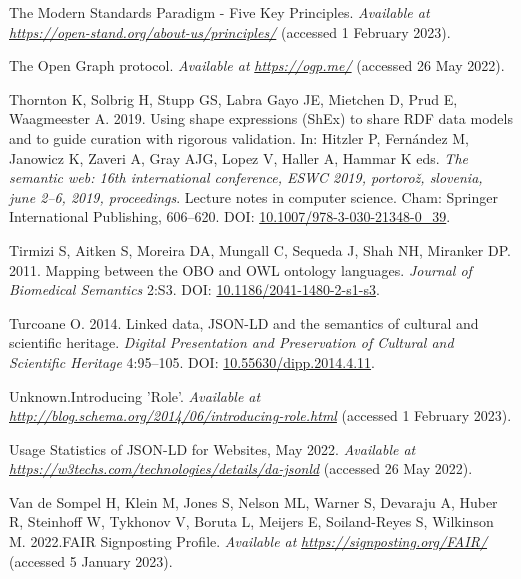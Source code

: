 \begin{CSLReferences}{1}{0}
\leavevmode{}%
The Modern Standards Paradigm - Five Key Principles. \emph{Available at} \href{https://open-stand.org/about-us/principles/}{\emph{https://open-stand.org/about-us/principles/}} (accessed 1 February 2023).

\leavevmode{}%
The Open Graph protocol. \emph{Available at} \href{https://ogp.me/}{\emph{https://ogp.me/}} (accessed 26 May 2022).

\leavevmode{}%
Thornton K, Solbrig H, Stupp GS, Labra Gayo JE, Mietchen D, Prud E, Waagmeester A. 2019. Using shape expressions (ShEx) to share RDF data models and to guide curation with rigorous validation. In: Hitzler P, Fernández M, Janowicz K, Zaveri A, Gray AJG, Lopez V, Haller A, Hammar K eds. \emph{The semantic web: 16th international conference, ESWC 2019, portorož, slovenia, june 2--6, 2019, proceedings}. Lecture notes in computer science. Cham: Springer International Publishing, 606--620. DOI: \href{https://doi.org/10.1007/978-3-030-21348-0_39}{10.1007/978-3-030-21348-0\_39}.

\leavevmode{}%
Tirmizi S, Aitken S, Moreira DA, Mungall C, Sequeda J, Shah NH, Miranker DP. 2011. Mapping between the OBO and OWL ontology languages. \emph{Journal of Biomedical Semantics} 2:S3. DOI: \href{https://doi.org/10.1186/2041-1480-2-s1-s3}{10.1186/2041-1480-2-s1-s3}.

\leavevmode{}%
Turcoane O. 2014. Linked data, JSON-LD and the semantics of cultural and scientific heritage. \emph{Digital Presentation and Preservation of Cultural and Scientific Heritage} 4:95--105. DOI: \href{https://doi.org/10.55630/dipp.2014.4.11}{10.55630/dipp.2014.4.11}.

\leavevmode{}%
Unknown.Introducing 'Role'. \emph{Available at} \href{http://blog.schema.org/2014/06/introducing-role.html}{\emph{http://blog.schema.org/2014/06/introducing-role.html}} (accessed 1 February 2023).

\leavevmode{}%
Usage Statistics of JSON-LD for Websites, May 2022. \emph{Available at} \href{https://w3techs.com/technologies/details/da-jsonld}{\emph{https://w3techs.com/technologies/details/da-jsonld}} (accessed 26 May 2022).

\leavevmode{}%
Van de Sompel H, Klein M, Jones S, Nelson ML, Warner S, Devaraju A, Huber R, Steinhoff W, Tykhonov V, Boruta L, Meijers E, Soiland-Reyes S, Wilkinson M. 2022.FAIR Signposting Profile. \emph{Available at} \href{https://signposting.org/FAIR/}{\emph{https://signposting.org/FAIR/}} (accessed 5 January 2023).


\end{CSLReferences}
